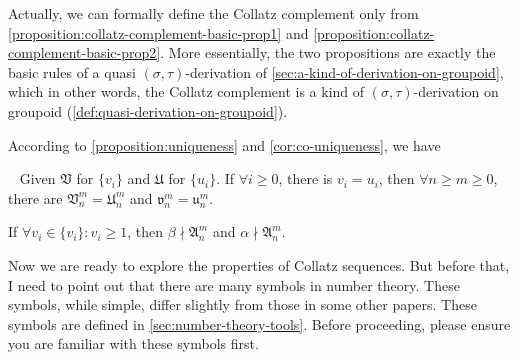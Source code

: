 Actually, we can formally define the Collatz complement only from \cref{proposition:collatz-complement-basic-prop1} and \cref{proposition:collatz-complement-basic-prop2}.
More essentially, the two propositions are exactly the basic rules of a quasi $(\sigma, \tau)$-derivation of \cref{sec:a-kind-of-derivation-on-groupoid}, which in other words, the Collatz complement is a kind of $(\sigma, \tau)$-derivation on groupoid (\cref{def:quasi-derivation-on-groupoid}).

According to \cref{proposition:uniqueness} and \cref{cor:co-uniqueness}, we have
\begin{proposition}[Uniqueness]~\label{proposition:uniquess-of-Collatz-complement}
    Given $\mathfrak{V}$ for $\{v_i\}$ and $\mathfrak{U}$ for $\{u_i\}$. If $\forall i\ge 0$, there is $v_i = u_i$, then $\forall n \ge m \ge 0$, there are $\mathfrak{V}_n^{m} = \mathfrak{U}_n^{m}$ and $\mathfrak{v}_n^{m} = \mathfrak{u}_n^{m}$.
\end{proposition}
\begin{proposition}
    If $\forall v_i \in \{v_i\}: v_i \ge 1$, then $\beta\nmid \mathfrak{A}_n^{m}$ and $\alpha \nmid \mathfrak{A}_n^{m}$.
\end{proposition}

Now we are ready to explore the properties of Collatz sequences.
But before that, I need to point out that there are many symbols in number theory.
These symbols, while simple, differ slightly from those in some other papers.
These symbols are defined in \cref{sec:number-theory-tools}. Before proceeding, please ensure you are familiar with these symbols first.
